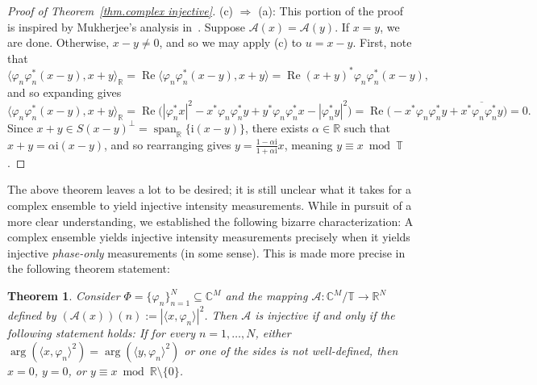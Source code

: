 \documentclass[times,10pt]{elsarticle}
\theoremstyle{plain}
\newtheorem{theorem}{Theorem}
\begin{document}
\begin{proof}[Proof of Theorem~\ref{thm.complex injective}]
(c) $\Rightarrow$ (a):
This portion of the proof is inspired by Mukherjee's analysis in~\cite{Mukherjee:81}.
Suppose $\mathcal{A}(x)=\mathcal{A}(y)$.
If $x=y$, we are done.
Otherwise, $x-y\neq0$, and so we may apply (c) to $u=x-y$.
First, note that 
\begin{equation*}
\langle \varphi_n\varphi_n^*(x-y),x+y\rangle_\mathbb{R}
=\operatorname{Re}\langle \varphi_n\varphi_n^*(x-y),x+y\rangle
=\operatorname{Re}(x+y)^*\varphi_n\varphi_n^*(x-y),
\end{equation*}
and so expanding gives
\begin{equation*}
\langle \varphi_n\varphi_n^*(x-y),x+y\rangle_\mathbb{R}
=\operatorname{Re}\Big(|\varphi_n^*x|^2-x^*\varphi_n\varphi_n^*y+y^*\varphi_n\varphi_n^*x-|\varphi_n^*y|^2\Big)
=\operatorname{Re}\Big(-x^*\varphi_n\varphi_n^*y+\overline{x^*\varphi_n\varphi_n^*y}\Big)
=0.
\end{equation*}
Since $x+y\in S(x-y)^\perp=\operatorname{span}_\mathbb{R}\{\mathrm{i}(x-y)\}$, there exists $\alpha\in\mathbb{R}$ such that $x+y=\alpha \mathrm{i}(x-y)$, and so rearranging gives $y=\frac{1-\alpha \mathrm{i}}{1+\alpha \mathrm{i}}x$, meaning $y\equiv x\bmod\mathbb{T}$.
\qquad
\end{proof}

The above theorem leaves a lot to be desired; it is still unclear what it takes for a complex ensemble to yield injective intensity measurements.
While in pursuit of a more clear understanding, we established the following bizarre characterization:
A complex ensemble yields injective intensity measurements precisely when it yields injective \textit{phase-only} measurements (in some sense).
This is made more precise in the following theorem statement:

\begin{theorem}
\label{thm.complex phase only}
Consider $\Phi=\{\varphi_n\}_{n=1}^N\subseteq\mathbb{C}^M$ and the mapping $\mathcal{A}\colon\mathbb{C}^M/\mathbb{T}\rightarrow\mathbb{R}^N$ defined by $(\mathcal{A}(x))(n):=|\langle x,\varphi_n\rangle|^2$.
Then $\mathcal{A}$ is injective if and only if the following statement holds: 
If for every $n=1,\ldots,N$, either $\operatorname{arg}(\langle x,\varphi_n\rangle^2)=\operatorname{arg}(\langle y,\varphi_n\rangle^2)$ or one of the sides is not well-defined, then $x=0$, $y=0$, or $y\equiv x\bmod\mathbb{R}\setminus\{0\}$. 
\end{theorem}
\end{document}
